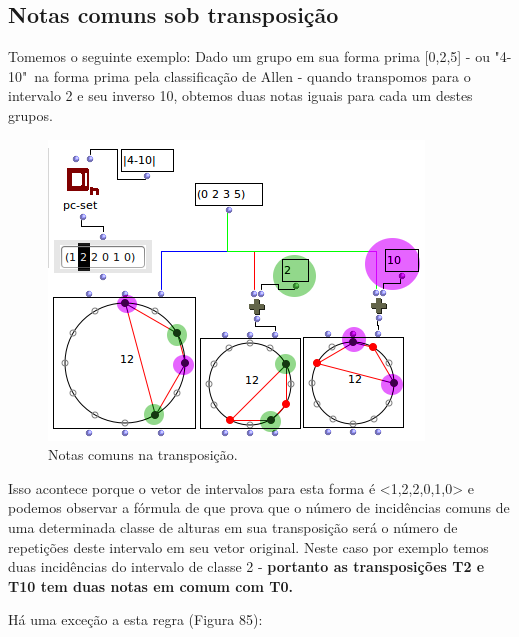 \documentclass[
	12pt,				%
	openright,			%
	twoside,			%
	a4paper,			%
	english,			%
	french,				%
	spanish,			%
	brazil				%
	]{abntex2}
\begin{document}
\begin{apendicesenv}
\subsection{Notas comuns sob transposição}

Tomemos o seguinte exemplo: Dado um grupo em sua forma prima [0,2,5] - ou "4-10"\ na forma prima pela classificação de Allen  - quando transpomos para o intervalo 2 e seu inverso 10, obtemos duas notas iguais para cada um destes grupos.

\begin{figure}[!h]
	\caption{\label{fig_grafico}Notas comuns na transposição. }
	\begin{center}
	    \includegraphics[scale=0.7]{OM_settheory/notas_comuns_2e10.png}
	\end{center}
\end{figure}


Isso acontece porque o vetor de intervalos para esta forma é <1,2,2,0,1,0> e podemos observar a fórmula de  que prova que o número de incidências comuns de uma determinada classe de alturas em sua transposição será o número de repetições deste intervalo em seu vetor original. Neste caso por exemplo temos duas incidências do intervalo de classe 2 - \textbf{portanto as transposições T2 e T10 tem duas notas em comum com T0.}

Há uma exceção a esta regra (Figura 85):
 

\end{apendicesenv}
\end{document}
